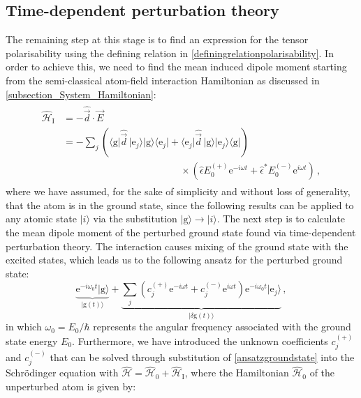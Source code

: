 \documentclass[../Thesis-IJspeert.tex]{subfiles}
\begin{document}
\subsection{Time-dependent perturbation theory}
The remaining step at this stage is to find an expression for the tensor polarisability using the defining relation in \autoref{definingrelationpolarisability}. In order to achieve this, we need to find the mean induced dipole moment starting from the semi-classical atom-field interaction Hamiltonian as discussed in \autoref{subsection_System_Hamiltonian}:
\begin{align}
\begin{split}
	\hat{\mathcal{H}}_\mathrm{I} &= -\hat{\vec{d}} \cdot \vec{E} \\ &=-\sum_{j} \left( \langle \mathrm{g} \vert \hat{\vec{d}}\, \vert \mathrm{e}_j \rangle \vert \mathrm{g} \rangle \langle \mathrm{e}_j \vert +  \langle \mathrm{e}_j \vert \hat{\vec{d}}\, \vert \mathrm{g} \rangle \vert \mathrm{e}_j \rangle \langle \mathrm{g} \vert \right)  \\ &\hspace{12em} \times \left( \hat{\epsilon}E_0^{(+)} \mathrm{e}^{-i\omega t} + \hat{\epsilon}^*E_0^{(-)} \mathrm{e}^{i\omega t} \right) \,,
\end{split}
\end{align}
where we have assumed, for the sake of simplicity and without loss of generality, that the atom is in the ground state, since the following results can be applied to any atomic state $\vert i \rangle$ via the substitution $\vert \mathrm{g} \rangle \rightarrow \vert i \rangle$. The next step is to calculate the mean dipole moment of the perturbed ground state found via time-dependent perturbation theory. The interaction causes mixing of the ground state with the excited states, which leads us to the following ansatz for the perturbed ground state:
\begin{equation}
\label{ansatzgroundstate}
	\underbrace{\mathrm{e}^{-i\omega_0 t} \vert \mathrm{g} \rangle}_{\vert \mathrm{g}(t) \rangle} + \underbrace{\sum_j \left( c_j^{(+)} \mathrm{e}^{-i\omega t} + c_j^{(-)} \mathrm{e}^{i\omega t} \right) \mathrm{e}^{-i\omega_0 t} \vert \mathrm{e}_j \rangle }_{\vert \delta \mathrm{g} (t) \rangle} \,,
\end{equation}
in which $\omega_0=E_0/\hbar$ represents the angular frequency associated with the ground state energy $E_0$. Furthermore, we have introduced the unknown coefficients $c_j^{(+)}$ and $c_j^{(-)}$ that can be solved through substitution of \autoref{ansatzgroundstate} into the Schrödinger equation with $\hat{\mathcal{H}}=\hat{\mathcal{H}}_0+\hat{\mathcal{H}}_\mathrm{I}$, where the Hamiltonian $\hat{\mathcal{H}}_0$ of the unperturbed atom is given by:
\end{document}

